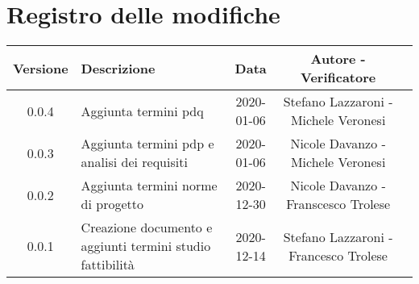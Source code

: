 \section*{Registro delle modifiche}

\begin{center}
	\begin{longtable}{|c|p{5cm}|c|c|c|}
	\hline
	\rowcolor{lighter-grayer}
	\textbf{Versione} & \textbf{Descrizione} & \textbf{Data} & \textbf{Autore - Verificatore} \\
	\hline
	\endfirsthead


	\hline
	0.0.4 & Aggiunta termini pdq & 2020-01-06 & Stefano Lazzaroni - Michele Veronesi\\
	0.0.3 & Aggiunta termini pdp e analisi dei requisiti & 2020-01-06 & Nicole Davanzo - Michele Veronesi\\
	0.0.2 & Aggiunta termini norme di progetto & 2020-12-30 & Nicole Davanzo -  Franscesco Trolese\\
	0.0.1 & Creazione documento e aggiunti termini studio fattibilità & 2020-12-14 & Stefano Lazzaroni - Francesco Trolese\\
	\hline

	\end{longtable}
\end{center}
